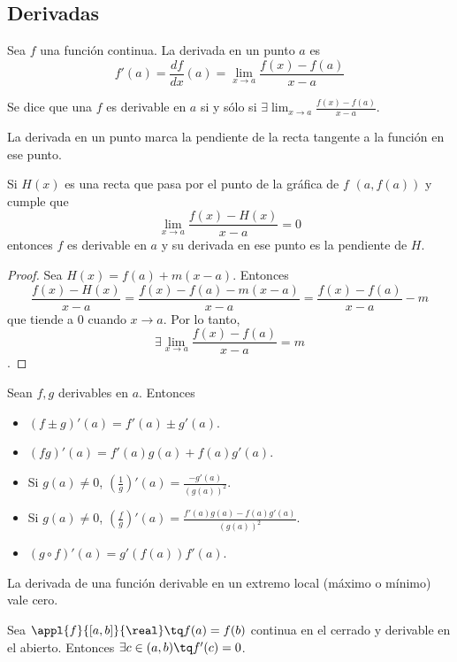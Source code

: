 \documentclass[palatino, nochap]{apuntes}
\begin{document}
\subsection{Derivadas}

\begin{defn}[Derivada]
Sea $f$ una función continua. La derivada en un punto $a$ es
\[f'(a)=\frac{df}{dx}(a)=\lim_{x\to a} \frac{f(x)-f(a)}{x-a} \]

Se dice que una $f$ es derivable en $a$ si y sólo si $\exists \lim_{x\to a} \frac{f(x)-f(a)}{x-a}$.

La derivada en un punto marca la pendiente de la recta tangente a la función en ese punto.
\end{defn}

\begin{prop}
Si $H(x)$ es una recta que pasa por el punto de la gráfica de $f$ $(a, f(a))$ y cumple que \[\lim_{x\to a} \frac{f(x)-H(x)}{x-a}=0\] entonces $f$ es derivable en $a$ y su derivada en ese punto es la pendiente de $H$.\end{prop}

\begin{proof}
Sea $H(x)= f(a)+m(x-a)$. Entonces \[ \frac{f(x)-H(x)}{x-a}=\frac{f(x)-f(a)-m(x-a)}{x-a}=\frac{f(x)-f(a)}{x-a}-m\] que tiende a 0 cuando $x\to a$. Por lo tanto, \[\exists \lim_{x\to a}\frac{f(x)-f(a)}{x-a}=m\].
\end{proof}

\begin{prop}
Sean $f, g$ derivables en $a$. Entonces
\begin{itemize}
\item $(f\pm g)'(a)=f'(a)\pm g'(a)$.
\item $(fg)'(a)=f'(a)g(a)+f(a)g'(a)$.
\item Si $g(a)\neq 0 $, $\left(\frac{1}{g}\right)'(a)=\frac{-g'(a)}{(g(a))^2}$.
\item Si $g(a)\neq 0$, $\left(\frac{f}{g}\right)'(a)=\frac{f'(a)g(a)-f(a)g'(a)}{(g(a))^2}$.
\item $(g\circ f)'(a)= g'(f(a))f'(a)$.
\end{itemize}
\end{prop}

\begin{prop}La derivada de una función derivable en un extremo local (máximo o mínimo) vale cero.\end{prop}

\begin{theorem}
Sea $\appl{f}{[a,b]}{\real} \tq f(a)=f(b)$ continua en el cerrado y derivable en el abierto. Entonces $\exists c \in (a,b) \tq f'(c)=0$.
\end{theorem}
\end{document}
